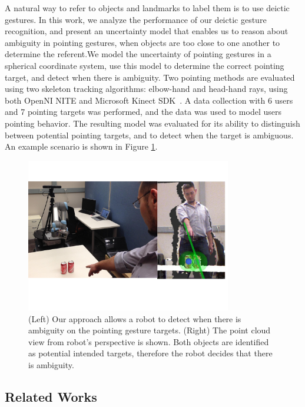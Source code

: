A natural way to refer to objects and landmarks to label them is to use deictic gestures. In this work, we analyze the performance of our deictic gesture recognition, and present an uncertainty model that enables us to reason about ambiguity in pointing gestures, when objects are too close to one another to determine the referent.We model the uncertainty of pointing gestures in a spherical coordinate system, use this model to determine the correct pointing target, and detect when there is ambiguity. Two pointing methods are evaluated using two skeleton tracking algorithms: elbow-hand and head-hand rays, using both OpenNI NITE and Microsoft Kinect SDK~\cite{shotton2011real}.  A data collection with 6 users and 7 pointing targets was performed, and the data was used to model users pointing behavior.  The resulting model was evaluated for its ability to distinguish between potential pointing targets, and to detect when the target is ambiguous.  An example scenario is shown in Figure \ref{fig:cover_pointing_gestures}.

\begin{figure}[ht!]
\centering
\includegraphics[width=0.8\textwidth]{pics/cover_pointing_gestures}
\caption{(Left) Our approach allows a robot to detect when there is ambiguity on the pointing gesture targets. (Right) The point cloud view from robot's perspective is shown. Both objects are identified as potential intended targets, therefore the robot decides that there is ambiguity.}
\label{fig:cover_pointing_gestures}
\end{figure}



\subsection{Related Works}
\label{sec:pointing_related_works}

